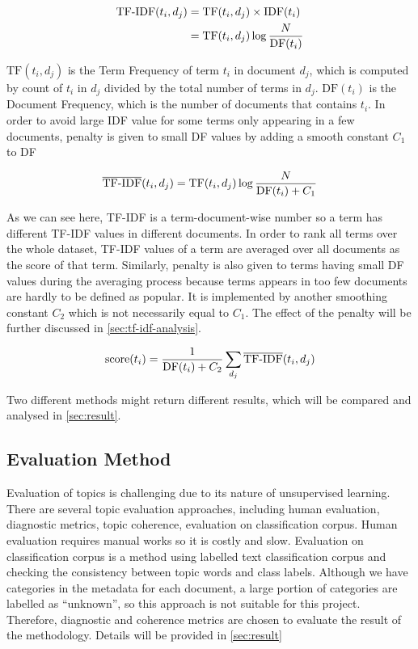 \documentclass[conference]{IEEEtran}
\begin{document}
\begin{align*}
\mathrm{TF{\text -}IDF}(t_i, d_j) &= 
\mathrm{TF}(t_i, d_j) \times \mathrm{IDF}(t_i) \\
& = \mathrm{TF}(t_i, d_j) \log \frac{N}{\mathrm{DF}(t_i)}
\end{align*}

\(\mathrm{TF}(t_i, d_j)\) is the Term Frequency of term \(t_i\) in
document \(d_j\), which is computed by count of \(t_i\) in \(d_j\)
divided by the total number of terms in \(d_j\). \(\mathrm{DF}(t_i)\) is
the Document Frequency, which is the number of documents that contains
\(t_i\). In order to avoid large IDF value for some terms only appearing
in a few documents, penalty is given to small DF values by adding a
smooth constant \({C}_{1}\) to DF

\[\mathrm{\overline{TF{\text -}IDF}}(t_i, d_j)
= \mathrm{TF}(t_i, d_j) \log \frac{N}{\mathrm{DF}(t_i) + {C}_{1}}\]

As we can see here, TF-IDF is a term-document-wise number so a term has
different TF-IDF values in different documents. In order to rank all
terms over the whole dataset, TF-IDF values of a term are averaged over
all documents as the score of that term. Similarly, penalty is also
given to terms having small DF values during the averaging process
because terms appears in too few documents are hardly to be defined as
popular. It is implemented by another smoothing constant \(C_2\) which
is not necessarily equal to \(C_1\). The effect of the penalty will be
further discussed in \cref{sec:tf-idf-analysis}.

\[\mathrm{score}(t_i)=\frac{1}{\mathrm{DF}(t_i) + {C}_{2}}
\sum_{d_j}\mathrm{\overline{TF{\text -}IDF}}(t_i, d_j)\]

Two different methods might return different results, which will be
compared and analysed in \cref{sec:result}.

\hypertarget{evaluation-method}{%
\subsection{Evaluation Method}\label{evaluation-method}}

Evaluation of topics is challenging due to its nature of unsupervised
learning. There are several topic evaluation approaches, including human
evaluation, diagnostic metrics, topic coherence, evaluation on
classification corpus. Human evaluation requires manual works so it is
costly and slow. Evaluation on classification corpus is a method using
labelled text classification corpus and checking the consistency between
topic words and class labels. Although we have categories in the
metadata for each document, a large portion of categories are labelled
as ``unknown'', so this approach is not suitable for this project.
Therefore, diagnostic and coherence metrics are chosen to evaluate the
result of the methodology. Details will be provided in \cref{sec:result}
\end{document}
